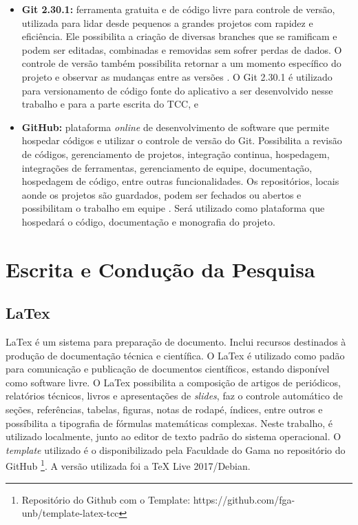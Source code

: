 \begin{itemize}

    \item \textbf{Git 2.30.1: }ferramenta gratuita e de código livre para controle 
	de versão, utilizada para lidar desde pequenos a grandes projetos com rapidez e 
	eficiência. Ele possibilita a criação de diversas branches que se ramificam e 
	podem ser editadas, combinadas e removidas sem sofrer perdas de dados. O controle de 
	versão também possibilita retornar a um momento específico do projeto e observar as 
	mudanças entre as versões \cite{git2020}. O Git 2.30.1 é utilizado para versionamento de código fonte 
	do aplicativo a ser desenvolvido nesse trabalho 
	e para a parte escrita do TCC, e
	\item \textbf{GitHub: }plataforma \emph{online} de desenvolvimento de 
	software que permite hospedar códigos e utilizar o controle de versão do Git. 
	Possibilita a revisão de códigos, gerenciamento de projetos, integração continua, 
	hospedagem, integrações de ferramentas, gerenciamento de equipe, documentação, 
	hospedagem de código, entre outras funcionalidades. Os repositórios, locais 
	aonde os projetos são guardados, podem ser fechados ou abertos e possibilitam o 
	trabalho em equipe \cite{github2020}. Será utilizado como plataforma que hospedará o código, 
	documentação e monografia do projeto.
    
\end{itemize}

\section{Escrita e Condução da Pesquisa}

\subsection{LaTex}

LaTex \cite{latex2020} é um sistema para preparação de documento. Inclui 
recursos destinados à produção de documentação técnica e científica. O LaTex é 
utilizado como padão para comunicação e publicação de documentos científicos, estando 
disponível como software livre. O LaTex possibilita a composição de artigos de 
periódicos, relatórios técnicos, livros e apresentações de \emph{slides}, faz 
o controle automático de seções, referências, tabelas, figuras, notas de rodapé, 
índices, entre outros e possíbilita a tipografia de fórmulas matemáticas 
complexas. Neste trabalho, é utilizado localmente, junto ao editor de texto 
padrão do sistema operacional. O \emph{template} utilizado é o disponibilizado pela 
Faculdade do Gama no repositório do GitHub \footnote{Repositório do Github com o Template: https://github.com/fga-unb/template-latex-tcc}.
A versão utilizada foi a TeX Live 2017/Debian.


